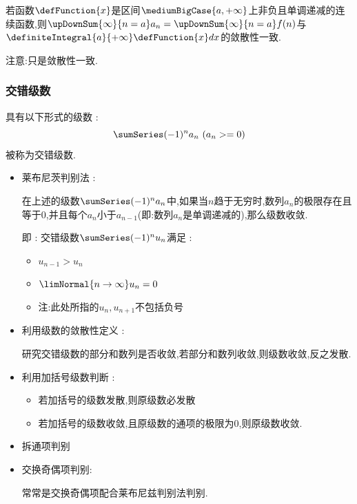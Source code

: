 {{{{\begin{itemize}
{            若函数$\defFunction{x}$是区间$\mediumBigCase{a,+\infty}$上非负且单调递减的连续函数,则$\upDownSum{\infty}{n = a} a_n = \upDownSum{\infty}{n = a} f(n)$与$\definiteIntegral{a}{+\infty}\defFunction{x}dx$的敛散性一致.

            注意:只是敛散性一致.
            }
    \end{itemize}
  }%

  \subsubsection{交错级数}{
    具有以下形式的级数 :
    $$
      \sumSeries (-1)^na_n\ (a_n >= 0)
    $$
    被称为交错级数.

    \begin{itemize}
      \item {
            莱布尼茨判别法 :

            在上述的级数$\sumSeries (-1)^na_n$中,如果当$n$趋于无穷时,数列$a_n$的极限存在且等于$0$,并且每个$a_n$小于$a_{n-1}$(即:数列$a_n$是单调递减的),那么级数收敛.

            即 : 交错级数$\sumSeries(-1)^{n}u_n$满足 :
            \begin{itemize}
              \item $u_{n - 1} > u_n$
              \item $\limNormal{n \to \infty}u_n = 0$
              \item 注:此处所指的$u_n,u_{n + 1}$不包括负号
            \end{itemize}
            }
      \item{
            利用级数的敛散性定义 :

            研究交错级数的部分和数列是否收敛,若部分和数列收敛,则级数收敛,反之发散.
            }
      \item{
            利用加括号级数判断 :

            \begin{itemize}
              \item 若加括号的级数发散,则原级数必发散
              \item 若加括号的级数收敛,且原级数的通项的极限为$0$,则原级数收敛.
            \end{itemize}
            }
      \item 拆通项判别
      \item {
            交换奇偶项判别:

            常常是交换奇偶项配合莱布尼兹判别法判别.
            }
    \end{itemize}
  }%

}}}
